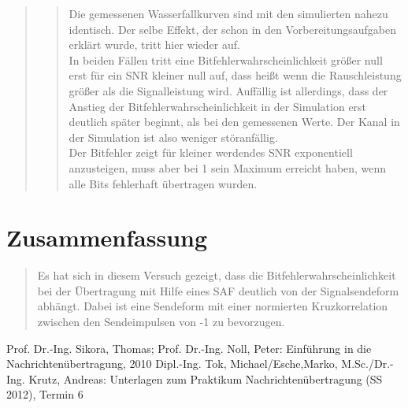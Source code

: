 \begin{quote}
\begin{quote}
       \vspace{2em}    
    
    Die gemessenen Wasserfallkurven sind mit den simulierten nahezu identisch. Der selbe Effekt, der schon in den
    Vorbereitungsaufgaben erklärt wurde, tritt hier wieder auf.\\
    In beiden Fällen tritt eine Bitfehlerwahrscheinlichkeit größer null erst für ein SNR kleiner null auf, dass heißt
    wenn die Rauschleistung größer als die Signalleistung wird. Auffällig ist allerdings, dass der Anstieg der
    Bitfehlerwahrscheinlichkeit in der Simulation erst deutlich später beginnt, als bei den gemessenen Werte. Der Kanal
    in der Simulation ist also weniger störanfällig.\\
    Der Bitfehler zeigt für kleiner werdendes SNR exponentiell anzusteigen, muss aber bei 1 sein Maximum erreicht haben,
    wenn alle Bits fehlerhaft übertragen wurden.
    
    \end{quote}
     
\end{quote}

\section{Zusammenfassung}
\begin{quote}
	
	Es hat sich in diesem Versuch gezeigt, dass die Bitfehlerwahrscheinlichkeit bei der Übertragung mit Hilfe eines SAF
	deutlich von der Signalsendeform abhängt. Dabei ist eine Sendeform mit einer normierten Kruzkorrelation zwischen den
	Sendeimpulsen von -1 zu bevorzugen.
 
    
\end{quote} %

\newpage

\begin{thebibliography}{999}




 Prof. Dr.-Ing. Sikora, Thomas; Prof. Dr.-Ing. Noll, Peter: Einführung in die
Nachrichtenübertragung, 2010
 Dipl.-Ing. Tok, Michael/Esche,Marko, M.Sc./Dr.-Ing. Krutz, Andreas: Unterlagen zum Praktikum
Nachrichtenübertragung (SS 2012), Termin 6
\end{thebibliography}


